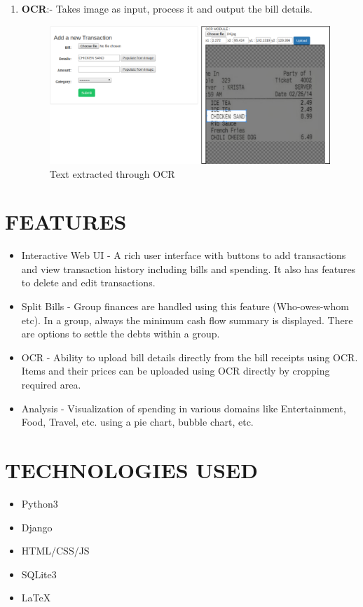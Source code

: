 \documentclass[12pt]{article}
\begin{document}
\begin{enumerate}
    \item \textbf{OCR}:- Takes image as input, process it and output the bill details.
    \begin{figure}[!ht]
        \centering
        \includegraphics[width=0.9\linewidth]{ocr.png}
        \caption{Text extracted through OCR}
        \label{fig:my_label}
    \end{figure}
\end{enumerate}


\pagebreak

\section{FEATURES}
\begin{itemize}
    \item Interactive Web UI - A rich user interface with buttons to add transactions and view transaction history including bills and spending. It also has features to delete and edit transactions.
    
    \item Split Bills - Group finances are handled using this feature (Who-owes-whom etc). In a group, always the minimum cash flow summary is displayed. There are options to settle the debts within a group.
    
    \item OCR - Ability to upload bill details directly from the bill receipts using OCR. Items and their prices can be uploaded using OCR directly by cropping required area.
    
    \item Analysis - Visualization of spending in various domains like Entertainment, Food, Travel, etc. using a pie chart, bubble chart, etc.
\end{itemize}


\newpage
\section{TECHNOLOGIES USED}
\begin{itemize}
    \item Python3
    \item Django
    \item HTML/CSS/JS
    \item SQLite3
    \item \LaTeX
\end{itemize}
\end{document}
